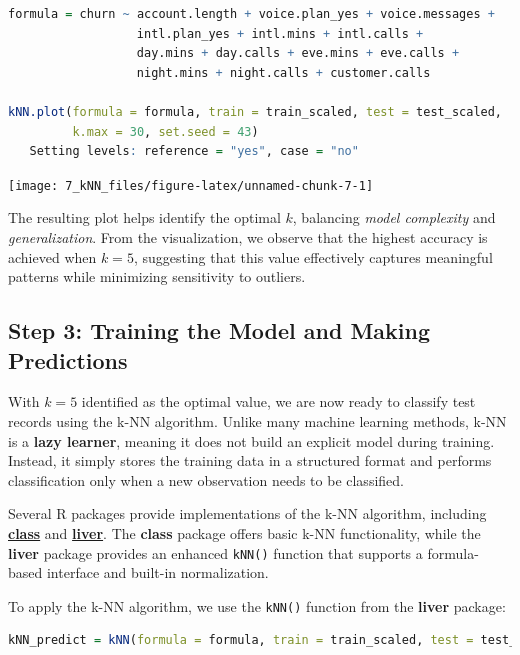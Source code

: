 \documentclass[
  11pt,
]{book}
\newcommand{\passthrough}[1]{#1}
\theoremstyle{definition}
\theoremstyle{definition}
\theoremstyle{definition}
\theoremstyle{definition}
\theoremstyle{remark}
\begin{document}
\begin{lstlisting}[language=R]
formula = churn ~ account.length + voice.plan_yes + voice.messages + 
                  intl.plan_yes + intl.mins + intl.calls + 
                  day.mins + day.calls + eve.mins + eve.calls + 
                  night.mins + night.calls + customer.calls

kNN.plot(formula = formula, train = train_scaled, test = test_scaled, 
         k.max = 30, set.seed = 43)
   Setting levels: reference = "yes", case = "no"
\end{lstlisting}

\begin{center}\texttt{[image: 7\_kNN\_files/figure-latex/unnamed-chunk-7-1]} \end{center}

The resulting plot helps identify the optimal \(k\), balancing \emph{model complexity} and \emph{generalization}. From the visualization, we observe that the highest accuracy is achieved when \(k = 5\), suggesting that this value effectively captures meaningful patterns while minimizing sensitivity to outliers.

\subsection{Step 3: Training the Model and Making Predictions}\label{step-3-training-the-model-and-making-predictions}

With \(k = 5\) identified as the optimal value, we are now ready to classify test records using the k-NN algorithm. Unlike many machine learning methods, k-NN is a \textbf{lazy learner}, meaning it does not build an explicit model during training. Instead, it simply stores the training data in a structured format and performs classification only when a new observation needs to be classified.

Several R packages provide implementations of the k-NN algorithm, including \href{https://CRAN.R-project.org/package=class}{\textbf{class}} and \href{https://CRAN.R-project.org/package=liver}{\textbf{liver}}. The \textbf{class} package offers basic k-NN functionality, while the \textbf{liver} package provides an enhanced \passthrough{\lstinline!kNN()!} function that supports a formula-based interface and built-in normalization.

To apply the k-NN algorithm, we use the \passthrough{\lstinline!kNN()!} function from the \textbf{liver} package:

\begin{lstlisting}[language=R]
kNN_predict = kNN(formula = formula, train = train_scaled, test = test_scaled, k = 5)
\end{lstlisting}
\end{document}
